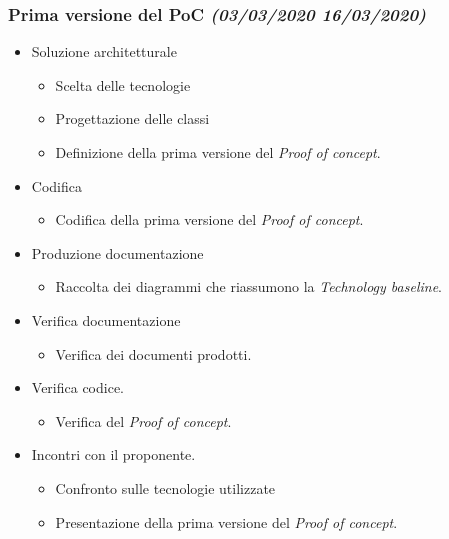 \documentclass[../piano-di-progetto.tex]{subfiles}
\begin{document}
\subsubsection[Prima versione del PoC]{Prima versione del PoC {\normalsize\normalfont\itshape(03/03/2020  16/03/2020)}}%
\label{subs:prima_versione_del_poc}
\begin{itemize}
  \item Soluzione architetturale
  \begin{itemize}
    \item Scelta delle tecnologie
    \item Progettazione delle classi
    \item Definizione della prima versione del \textit{Proof of concept}.
  \end{itemize}
  \item Codifica
  \begin{itemize}
    \item Codifica della prima versione del \textit{Proof of concept}.
  \end{itemize}
  \item Produzione documentazione
  \begin{itemize}
    \item Raccolta dei diagrammi che riassumono la \textit{Technology baseline}.
  \end{itemize}
  \item Verifica documentazione
  \begin{itemize}
    \item Verifica dei documenti prodotti.
  \end{itemize}
  \item Verifica codice.
  \begin{itemize}
    \item Verifica del \textit{Proof of concept}.
  \end{itemize}
  \item Incontri con il proponente.
  \begin{itemize}
    \item Confronto sulle tecnologie utilizzate
    \item Presentazione della prima versione del \textit{Proof of concept}.
  \end{itemize}
\end{itemize}
\end{document}
